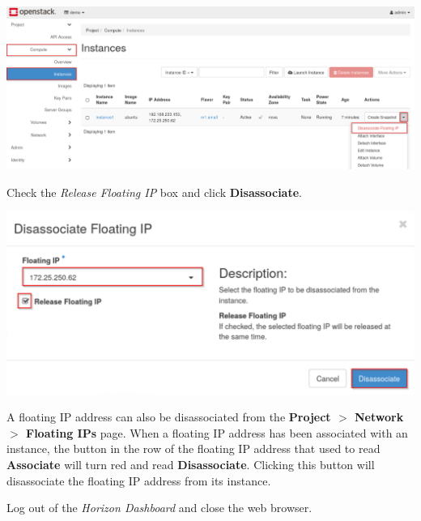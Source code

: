 \documentclass[letterpaper, 12pt]{article}
\begin{document}
\begin{enumerate}
\begin{labstep}
        \begin{center}
            \includegraphics[width=\linewidth]{images/part3/step11.png}
        \end{center}
    \end{labstep}

    \begin{labstep}
        Check the \textit{Release Floating IP} box and click \textbf{Disassociate}.

        \begin{center}
            \includegraphics[width=\linewidth]{images/part3/step12.png}
        \end{center}
    \end{labstep}

    \begin{tipbox}
        A floating IP address can also be disassociated from the \textbf{Project $>$ Network $>$ Floating IPs} page.
        When a floating IP address has been associated with an instance, the button in the row of the floating IP address that used to read \textbf{Associate} will turn red and read \textbf{Disassociate}.
        Clicking this button will disassociate the floating IP address from its instance.
    \end{tipbox}

    \begin{labstep}
        Log out of the \textit{Horizon Dashboard} and close the web browser.
    \end{labstep}


\end{enumerate}
\end{document}
